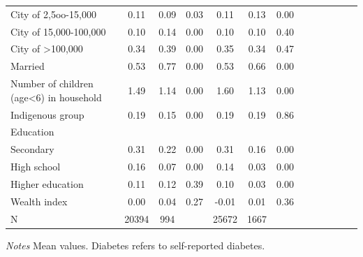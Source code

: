 \documentclass[12pt,english]{article}
\begin{document}
\begin{table}[!ht]
\begin{adjustbox}{max width=\linewidth, center}
\begin{threeparttable}
{\begin{tabular}{l*{6}{S S}}
					City of 2,5oo-15,000&        0.11&        0.09&        0.03&        0.11&        0.13&        0.00\\
					City of 15,000-100,000&        0.10&        0.14&        0.00&        0.10&        0.10&        0.40\\
					City of >100,000    &        0.34&        0.39&        0.00&        0.35&        0.34&        0.47\\
					Married             &        0.53&        0.77&        0.00&        0.53&        0.66&        0.00\\
					Number of children (age<6) in household&        1.49&        1.14&        0.00&        1.60&        1.13&        0.00\\
					Indigenous group    &        0.19&        0.15&        0.00&        0.19&        0.19&        0.86\\
					Education &&&&&& \\                    
					\hspace*{10mm}Secondary           &        0.31&        0.22&        0.00&        0.31&        0.16&        0.00\\
					\hspace*{10mm}High school         & 0.16&        0.07&        0.00&        0.14&        0.03&        0.00\\
					\hspace*{10mm}Higher education    & 0.11&        0.12&        0.39&        0.10&        0.03&        0.00\\
					Wealth index        &        0.00&        0.04&        0.27&       -0.01&        0.01&        0.36\\
					N &20394&994&&25672&1667&\\
					\bottomrule
				\end{tabular}
				\begin{tablenotes}
					\item \footnotesize \textit{Notes} Mean values. Diabetes refers to self-reported diabetes.
				\end{tablenotes}
			}
		\end{threeparttable}
	\end{adjustbox}
\end{table}
\clearpage
\end{document}
